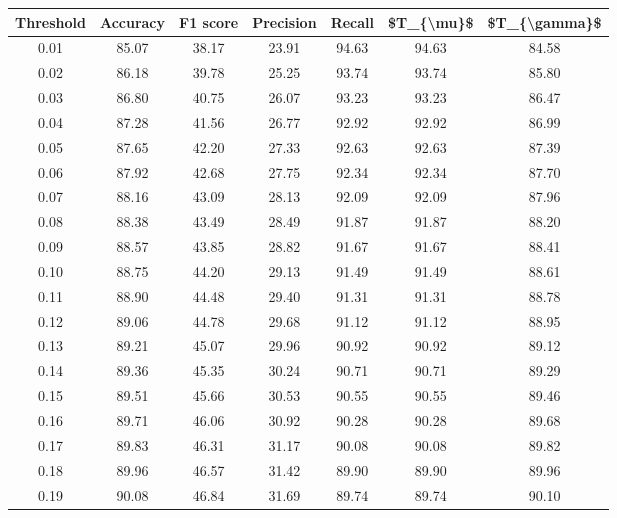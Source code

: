 \begin{tabular}{|c|c|c|c|c|c|c|}
\hline
 Threshold &  Accuracy &  F1 score &  Precision &  Recall &  \$T\_\{\textbackslash mu\}\$ &  \$T\_\{\textbackslash gamma\}\$ \\
\hline
      0.01 &     85.07 &     38.17 &      23.91 &   94.63 &      94.63 &         84.58 \\
      0.02 &     86.18 &     39.78 &      25.25 &   93.74 &      93.74 &         85.80 \\
      0.03 &     86.80 &     40.75 &      26.07 &   93.23 &      93.23 &         86.47 \\
      0.04 &     87.28 &     41.56 &      26.77 &   92.92 &      92.92 &         86.99 \\
      0.05 &     87.65 &     42.20 &      27.33 &   92.63 &      92.63 &         87.39 \\
      0.06 &     87.92 &     42.68 &      27.75 &   92.34 &      92.34 &         87.70 \\
      0.07 &     88.16 &     43.09 &      28.13 &   92.09 &      92.09 &         87.96 \\
      0.08 &     88.38 &     43.49 &      28.49 &   91.87 &      91.87 &         88.20 \\
      0.09 &     88.57 &     43.85 &      28.82 &   91.67 &      91.67 &         88.41 \\
      0.10 &     88.75 &     44.20 &      29.13 &   91.49 &      91.49 &         88.61 \\
      0.11 &     88.90 &     44.48 &      29.40 &   91.31 &      91.31 &         88.78 \\
      0.12 &     89.06 &     44.78 &      29.68 &   91.12 &      91.12 &         88.95 \\
      0.13 &     89.21 &     45.07 &      29.96 &   90.92 &      90.92 &         89.12 \\
      0.14 &     89.36 &     45.35 &      30.24 &   90.71 &      90.71 &         89.29 \\
      0.15 &     89.51 &     45.66 &      30.53 &   90.55 &      90.55 &         89.46 \\
      0.16 &     89.71 &     46.06 &      30.92 &   90.28 &      90.28 &         89.68 \\
      0.17 &     89.83 &     46.31 &      31.17 &   90.08 &      90.08 &         89.82 \\
      0.18 &     89.96 &     46.57 &      31.42 &   89.90 &      89.90 &         89.96 \\
      0.19 &     90.08 &     46.84 &      31.69 &   89.74 &      89.74 &         90.10 \\

\end{tabular}
